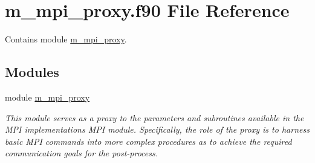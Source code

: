 \hypertarget{m__mpi__proxy_8f90}{}\section{m\+\_\+mpi\+\_\+proxy.\+f90 File Reference}
\label{m__mpi__proxy_8f90}


Contains module \hyperlink{namespacem__mpi__proxy}{m\+\_\+mpi\+\_\+proxy}.  


\subsection*{Modules}
\begin{DoxyCompactItemize}
\item 
module \hyperlink{namespacem__mpi__proxy}{m\+\_\+mpi\+\_\+proxy}
\begin{DoxyCompactList}\small\item\em This module serves as a proxy to the parameters and subroutines available in the M\+PI implementation\textquotesingle{}s M\+PI module. Specifically, the role of the proxy is to harness basic M\+PI commands into more complex procedures as to achieve the required communication goals for the post-\/process. \end{DoxyCompactList}\end{DoxyCompactItemize}
